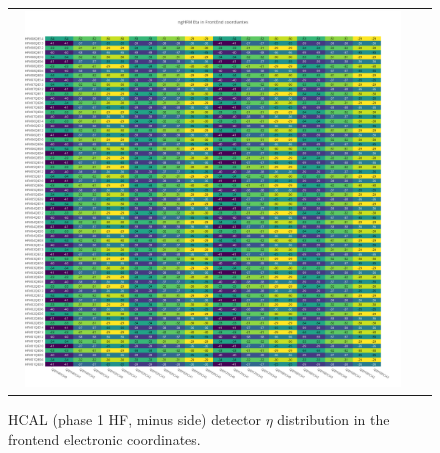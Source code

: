 \begin{figure}[htb]
 \begin{center}
  \begin{tabular}{cc}
   \includegraphics[angle=0,width=0.95\textwidth]{figures/appendix/ngHFM_Eta_in_FrontEnd.png}
  \end{tabular}
  \caption{HCAL (phase 1 HF, minus side) detector $\eta$ distribution in the frontend electronic coordinates.}
  \label{fig:lmapngHFMEtaFEC}
 \end{center}
\end{figure}
\clearpage

